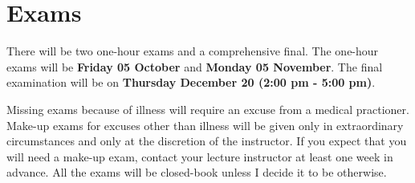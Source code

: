 \documentclass[twoside]{article}
\begin{document}
\section{Exams}
There will be two one-hour exams and a comprehensive final. The one-hour exams will be {\bf Friday 05
October} and {\bf Monday 05 November}. The final examination will be on {\bf Thursday December 20 (2:00 pm - 5:00 pm)}. 
\par Missing exams because of illness will require an excuse from a medical practioner. Make-up exams for
excuses other than illness will be given only in extraordinary circumstances and only at the discretion of
the instructor. If you expect that you will need a make-up exam, contact your lecture instructor at least one
week in advance. All the exams will be closed-book unless I decide it to be otherwise.
\end{document}
